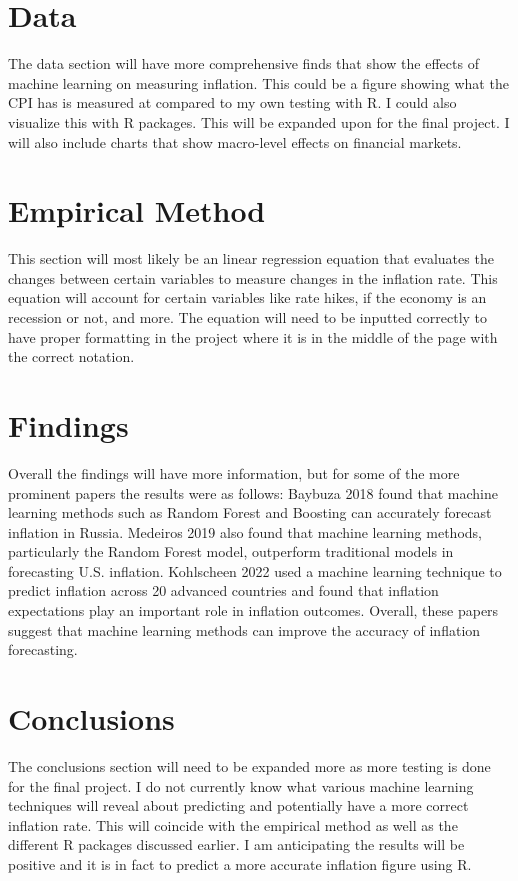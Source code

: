 \documentclass{article}
\begin{document}
\section{Data}

The data section will have more comprehensive finds that show the effects of machine learning on measuring inflation. This could be a figure showing what the CPI has is measured at compared to my own testing with R. I could also visualize this with R packages. This will be expanded upon for the final project. I will also include charts that show macro-level effects on financial markets.

\section{Empirical Method}

This section will most likely be an linear regression equation that evaluates the changes between certain variables to measure changes in the inflation rate. This equation will account for certain variables like rate hikes, if the economy is an recession or not, and more. The equation will need to be inputted correctly to have proper formatting in the project where it is in the middle of the page with the correct notation. 

\section{Findings}

Overall the findings will have more information, but for some of the more prominent papers the results were as follows: Baybuza 2018 found that machine learning methods such as Random Forest and Boosting can accurately forecast inflation in Russia. Medeiros 2019 also found that machine learning methods, particularly the Random Forest model, outperform traditional models in forecasting U.S. inflation. Kohlscheen 2022 used a machine learning technique to predict inflation across 20 advanced countries and found that inflation expectations play an important role in inflation outcomes. Overall, these papers suggest that machine learning methods can improve the accuracy of inflation forecasting. 

\section{Conclusions}

The conclusions section will need to be expanded more as more testing is done for the final project. I do not currently know what various machine learning techniques will reveal about predicting and potentially have a more correct inflation rate. This will coincide with the empirical method as well as the different R packages discussed earlier. I am anticipating the results will be positive and it is in fact to predict a more accurate inflation figure using R.
\end{document}
